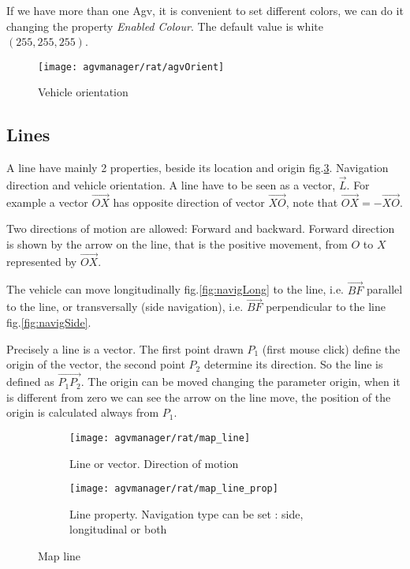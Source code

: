 If we have more than one Agv, it is convenient to set different colors, we can do it changing the property \textit{Enabled Colour}. The default value is white $(255,255,255)$.

\begin{figure}[h]
	\centering
	\texttt{[image: agvmanager/rat/agvOrient]}
	\caption{Vehicle orientation}
	\label{fig:agvOrient}
\end{figure}

\subsection{Lines}
A line have mainly 2 properties, beside its location and origin fig.\ref{fig:lineProp}. Navigation direction and vehicle orientation. A line have to be seen as a vector, $\overrightarrow{L}$. For example a vector $\overrightarrow{OX}$ has opposite direction of vector $\overrightarrow{XO}$, note that $\overrightarrow{OX}=-\overrightarrow{XO}$.

Two directions of motion are allowed: Forward and backward. Forward direction is shown by the arrow on the line, that is the positive movement, from $O$ to $X$ represented by $\overrightarrow{OX}$.

The vehicle can move longitudinally fig.\ref{fig:navigLong} to the line, i.e. $\overrightarrow{BF}$ parallel to the line, or transversally (side navigation), i.e. $\overrightarrow{BF}$ perpendicular to the line fig.\ref{fig:navigSide}.

Precisely a line is a vector. The first point drawn $P_{1}$ (first mouse click) define the origin of the vector, the second point $P_{2}$ determine its direction. So the line is defined as $\overrightarrow{P_{1}P_{2}}$. The origin can be moved changing the parameter origin, when it is different from zero we can see the arrow on the line move, the position of the origin is calculated always from $P_{1}$.

\begin{figure}[h]
	\centering
	\begin{subfigure}{0.3\textwidth}
		\texttt{[image: agvmanager/rat/map\_line]}
	\caption{Line or vector. Direction of motion}
	\label{fig:mapLine}
	\end{subfigure}
	\quad
	\begin{subfigure}{0.3\textwidth}
		\texttt{[image: agvmanager/rat/map\_line\_prop]}
	\caption{Line property. Navigation type can be set : side, longitudinal or both}
	\label{fig:lineProp}
	\end{subfigure}
	\caption{Map line}\label{fig:animals}
\end{figure}


